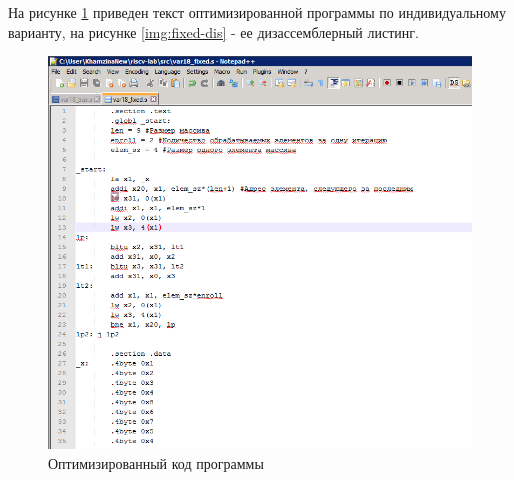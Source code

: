 На рисунке \ref{img:fixed} приведен текст оптимизированной программы по индивидуальному варианту, на рисунке  \ref{img:fixed-dis} - ее дизассемблерный листинг.

\begin{figure}[H]
	\begin{center}
		\includegraphics[scale=0.4]{img/code_asm_fixed.png}
	\end{center}
	\captionsetup{justification=centering}
	\caption{Оптимизированный код программы}
	\label{img:fixed}
\end{figure}

